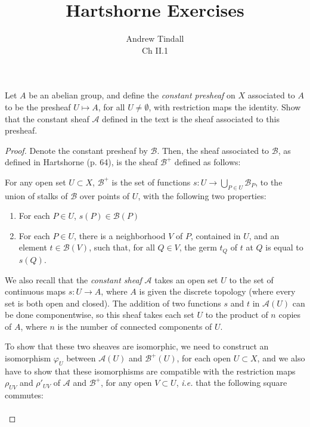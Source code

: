 \documentclass[12pt]{article}
\theoremstyle{definition}
\newenvironment{problem}[2][Problem]{\begin{trivlist}
\item[\hskip \labelsep {\bfseries #1}\hskip \labelsep {\bfseries #2.}]}{\end{trivlist}}
\begin{document}
 
 
\title{Hartshorne Exercises}
\author{Andrew Tindall \\
Ch II.1}
\maketitle
\begin{problem}{1}
Let $ A$ be an abelian group, and define the \textit{constant presheaf} on $X$ associated to $A$ to be the presheaf $U \mapsto A$, for all $U \neq \emptyset$, with restriction maps the identity. Show that the constant sheaf $\mathcal A$ defined in the text is the sheaf associated to this presheaf.
\begin{proof}
Denote the constant presheaf by $\mathcal B$. Then, the sheaf associated to $\mathcal B$, as defined in Hartshorne (p. 64), is the sheaf $\mathcal B^+$ defined as follows:
\par For any open set $U \subset X$, $\mathcal B^+$ is the set of functions $s: U \to \bigcup_{P \in U} \mathcal B_P$, to the union of stalks of $\mathcal B$ over points of $U$, with the following two properties:
\begin{enumerate}
    \item For each $P \in U$, $s(P) \in \mathcal B(P)$
    \item For each $P \in U$, there is a neighborhood $V$ of $P$, contained in $U$, and an element $t \in \mathcal B(V)$, such that, for all $Q \in V$, the germ $t_Q$ of $t$ at $Q$ is equal to $s(Q)$.
\end{enumerate}
\par We also recall that the \textit{constant sheaf} $\mathcal A$ takes an open set $U$ to the set of continuous maps $s: U \to A$, where $A$ is given the discrete topology (where every set is both open and closed). The addition of two functions $s$ and $t$ in $\mathcal A(U)$ can be done componentwise, so this sheaf takes each set $U$ to the product of $n$ copies of $A$, where $n$ is the number of connected components of $U$.
\par To show that these two sheaves are isomorphic, we need to construct an isomorphism $\varphi_U$ between $\mathcal A(U)$ and $\mathcal B^+(U)$, for each open $U \subset X$, and we also have to show that these isomorphisms are compatible with the restriction maps $\rho_{UV}$ and $\rho'_{UV}$ of $\mathcal A$ and $\mathcal B^+$, for any open $V \subset U$, \textit{i.e.} that the following square commutes:
\[
\begin{tikzcd}

\end{tikzcd}\]
\end{proof}
\end{problem}
\end{document}
